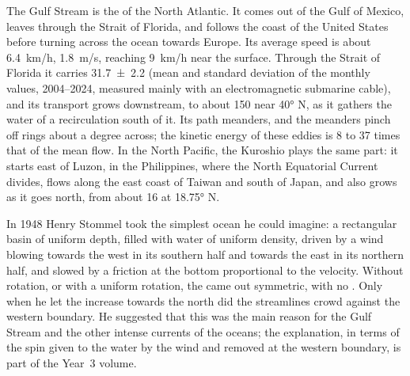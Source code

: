 The Gulf Stream is the  of the North Atlantic. It comes out
of the Gulf of Mexico, leaves through the Strait of Florida, and follows the coast of
the United States before turning across the ocean towards Europe. Its average speed
is about \qty{6.4}{km/h}, \qty{1.8}{m/s}, reaching \qty{9}{km/h} near the
surface. Through the Strait of Florida it carries
\qty[uncertainty-mode=separate]{31.7 \pm 2.2}{\sverdrup} (mean and standard deviation
of the monthly values, 2004--2024, measured mainly with an electromagnetic submarine
cable), and its transport grows
downstream, to about \qty{150}{\sverdrup} near \ang{40} N, as it gathers the water of
a recirculation south of it. Its path meanders, and the meanders pinch off rings
about a degree across; the kinetic energy of these eddies is 8 to 37 times that of
the mean flow. In the North Pacific, the Kuroshio plays the same part: it starts
east of Luzon, in the Philippines, where the North Equatorial Current divides, flows along the
east coast of Taiwan and south of Japan, and also grows as it goes north, from about
\qty{16}{\sverdrup} at \ang{18.75} N.

\begin{history}[Stommel 1948]
In 1948 Henry Stommel took the simplest ocean he could imagine: a rectangular basin
of uniform depth, filled with water of uniform density, driven by a wind blowing
towards the west in its southern half and towards the east in its northern half, and
slowed by a friction at the bottom proportional to the velocity. Without rotation,
or with a uniform rotation, the  came out symmetric, with no . Only when he let the  increase towards the north did the
streamlines crowd against the western boundary. He suggested that this was the main
reason for the Gulf Stream and the other intense currents of the oceans; the
explanation, in terms of the spin given to the water by the wind and removed at the
western boundary, is part of the Year~3 volume.
\end{history}

